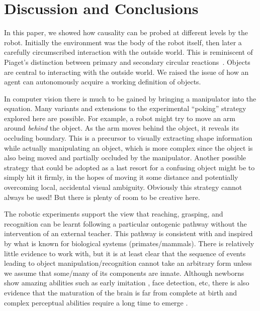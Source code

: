 
\section{Discussion and Conclusions}

In this paper, we showed how causality can be probed at different
levels by the robot.  Initially the environment was the body of the
robot itself, then later a carefully circumscribed interaction with
the outside world.  This is reminiscent of Piaget's distinction
between primary and secondary circular
reactions~\cite{ginsburg78piaget}.  Objects are central to interacting
with the outside world.  We raised the issue of how an agent can
autonomously acquire a working definition of objects. 

In computer vision there is much to be gained by bringing a
manipulator into the equation.  Many variants and extensions to the
experimental ``poking'' strategy explored here are possible.  For
example, a robot might try to move an arm around {\em behind} the
object.  As the arm moves behind the object, it reveals its occluding
boundary.  This is a precursor to visually extracting shape
information while actually manipulating an object, which is more
complex since the object is also being moved and partially occluded by
the manipulator.  Another possible strategy that could be adopted as a
last resort for a confusing object might be to simply hit it firmly,
in the hopes of moving it some distance and potentially overcoming
local, accidental visual ambiguity.  Obviously this strategy cannot
always be used!  But there is plenty of room to be creative here.

The robotic experiments support the view that reaching, grasping, and recognition
can be learnt following a particular ontogenic pathway without the
intervention of an external teacher.
This pathway is consistent with and inspired by what is 
known for biological systems (primates/mammals).
There is relatively little evidence to work with, but it is at least clear that the 
sequence of events leading to object manipulation/recognition cannot take
an arbitrary form unless we assume that some/many of its components are innate.
Although newborns show amazing abilities \cite{spelke-2000} such as early imitation 
\cite{meltzoff-moore-1977}, face detection, etc, there is also evidence 
that the maturation of the brain is far from complete at birth and
complex perceptual abilities require a long time to emerge \cite{kovacs00human}.



